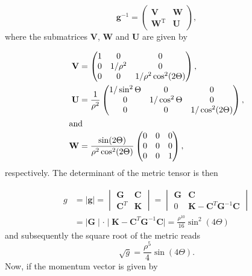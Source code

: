 \documentclass{article}
\numberwithin{equation}{section}
\numberwithin{figure}{section}
\begin{document}
\begin{equation}
\mathbf{g}^{-1}=
\begin{pmatrix}
\mathbf{V} & \mathbf{W}\\
\mathbf{W}^\mathrm{T} & \mathbf{U}
\end{pmatrix},
\end{equation}
where the submatrices $\mathbf{V}$, $\mathbf{W}$ and $\mathbf{U}$ are given by

\begin{align}
\mathbf{V} &=
\begin{pmatrix}
1 & 0      & 0\\
0 & 1/\rho^2 & 0\\
0 & 0      & 1/\rho^2\cos^2(2\Theta)
\end{pmatrix},\\
\mathbf{U} &=
\frac{1}{\rho^2}
\begin{pmatrix}
1/\sin^2\Theta & 0            & 0\\
0            & 1/\cos^2\Theta & 0\\
0            & 0            & 1/\cos^2(2\Theta)
\end{pmatrix},\\
\intertext{and}
\mathbf{W} &=
\frac{\sin(2\Theta)}{\rho^2\cos^2(2\Theta)}
\begin{pmatrix}
0 & 0 & 0\\
0 & 0 & 0\\
0 & 0 & 1
\end{pmatrix},
\end{align}
respectively. The determinant of the metric tensor is then

\begin{align}
g &=
\mid\mathbf{g}\mid=
\begin{vmatrix}
\mathbf{G} & \mathbf{C}\\
\mathbf{C}^T & \mathbf{K}
\end{vmatrix}
=
\begin{vmatrix}
\mathbf{G} & \mathbf{C}\\
0 & \mathbf{K} - \mathbf{C}^T \mathbf{G}^{-1} \mathbf{C}
\end{vmatrix}\\
&=
\mid \mathbf{G} \mid \cdot \mid\mathbf{K} - \mathbf{C}^T \mathbf{G}^{-1} \mathbf{C} \mid
=
\frac{\rho^{10}}{16}\sin^2(4\Theta)
\end{align}
and subsequently the square root of the metric reads
\begin{equation}
\sqrt{g}=\frac{\rho^5}{4}\sin(4\Theta).
\end{equation}
Now, if the momentum vector is given by
\end{document}
